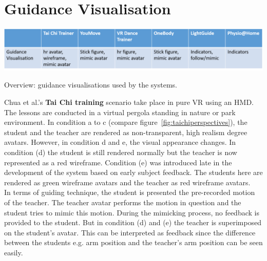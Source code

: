 \section{Guidance Visualisation}
\begin{table}[h!]
	\centering
	\includegraphics[width=1.0\textwidth]{img/tbl3.png}
	\caption{Overview: guidance visualisations used by the systems.}
	\label{fig:tbl1}
\end{table}
Chua et al.'s \textbf{Tai Chi training} scenario take place in pure VR using an HMD. The lessons are conducted in a virtual pergola standing in nature or park environment. In condition a to c (compare figure~\ref{fig:taichiperspectives}), the student and the teacher are rendered as non-transparent, high realism degree avatars. However, in condition d and e, the visual appearance changes. In condition (d) the student is still rendered normally but the teacher is now represented as a red wireframe. Condition (e) was introduced late in the development of the system based on early subject feedback. The students here are rendered as green wireframe avatars and the teacher as red wireframe avatars.\\
In terms of guiding technique, the student is presented the pre-recorded motion of the teacher. The teacher avatar performs the motion in question and the student tries to mimic this motion. During the mimicking process, no feedback is provided to the student. But in condition (d) and (e) the teacher is superimposed on the student's avatar. This can be interpreted as feedback since the difference between the students e.g. arm position and the teacher's arm position can be seen easily.\\ \\
